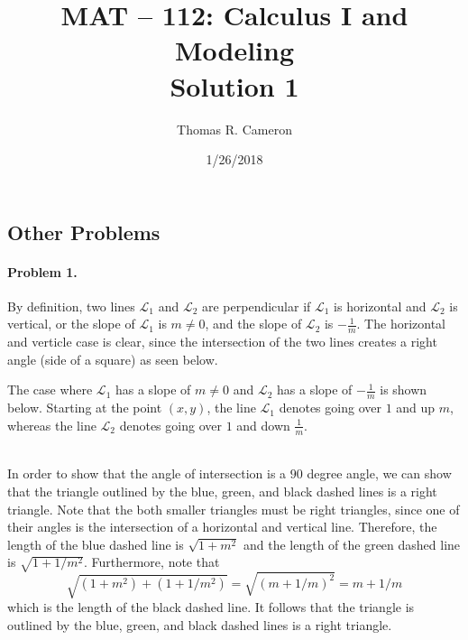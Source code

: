 \documentclass{article}
\title{MAT -- 112: Calculus I and Modeling\\
\large{Solution 1}}
\author{Thomas R. Cameron}
\date{1/26/2018}
\begin{document}
\maketitle

\subsection*{Other Problems}

\paragraph*{Problem 1.} By definition, two lines $\mathcal{L}_{1}$ and $\mathcal{L}_{2}$ are perpendicular if $\mathcal{L}_{1}$ is horizontal and $\mathcal{L}_{2}$ is vertical, or the slope of $\mathcal{L}_{1}$ is $m\neq 0$, and the slope of $\mathcal{L}_{2}$ is $-\frac{1}{m}$. The horizontal and verticle case is clear, since the intersection of the two lines creates a right angle (side of a square) as seen below.
\begin{figure}[h]
\centering
{}
\end{figure}


The case where $\mathcal{L}_{1}$ has a slope of $m\neq 0$ and $\mathcal{L}_{2}$ has a slope of $-\frac{1}{m}$ is shown below. Starting at the point $(x,y)$, the line $\mathcal{L}_{1}$ denotes going over $1$ and up $m$, whereas the line $\mathcal{L}_{2}$ denotes going over $1$ and down $\frac{1}{m}$. 
\begin{figure}[h]
\centering
{}
\end{figure}
~\\
In order to show that the angle of intersection is a $90$ degree angle, we can show that the triangle outlined by the blue, green, and black dashed lines is a right triangle. Note that the both smaller triangles must be right triangles, since one of their angles is the intersection of a horizontal and vertical line. Therefore, the length of the blue dashed line is $\sqrt{1+m^{2}}$ and the length of the green dashed line is $\sqrt{1+1/m^{2}}$. Furthermore, note that
\[
\sqrt{(1+m^{2})+(1+1/m^{2})}=\sqrt{(m+1/m)^{2}}=m+1/m
\]
which is the length of the black dashed line. It follows that the triangle is outlined by the blue, green, and black dashed lines is a right triangle. 
\end{document}
